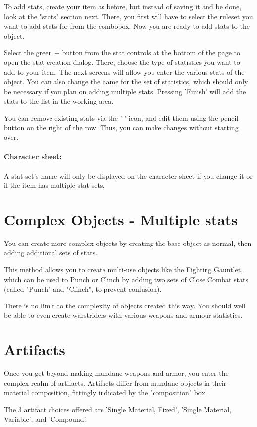 To add stats, create your item as before, but instead of saving it and be done, look at the "stats" section next. 
There, you first will have to select the ruleset you want to add stats for from the combobox. Now you are ready to add stats to the object. 

Select the green + button from the stat controls at the bottom of the page to open the stat creation dialog. There, choose the type of statistics you want to add to your item. The next screens will allow you enter the various stats of the object.  You can also change the name for the set of statistics, which should only be necessary if you plan on adding multiple stats. Pressing 'Finish' will add the stats to the list in the working area.

You can remove existing stats via the '-' icon, and edit them using the pencil button on the right of the row. Thus, you can make changes without starting over.

\paragraph{Character sheet:}  A stat-set's name will only be displayed on the character sheet if you change it or if the item has multiple stat-sets.

\section{Complex Objects - Multiple stats}
You can create more complex objects by creating the base object as normal, then adding additional sets of stats.   

This method allows you to create multi-use objects like the Fighting Gauntlet, which can be used to Punch or Clinch by adding two sets of Close Combat stats (called "Punch" and "Clinch", to prevent confusion).

There is no limit to the complexity of objects created this way. You should well be able to even create warstriders with various weapons and armour statistics. 

\section{Artifacts}
Once you get beyond making mundane weapons and armor, you enter the complex realm of artifacts. Artifacts differ from mundane objects in their material composition, fittingly indicated by the "composition" box.

The 3 artifact choices offered are 'Single Material, Fixed', 'Single Material, Variable', and 'Compound'.  

